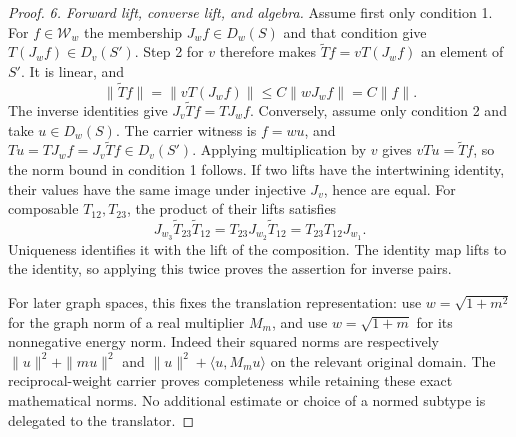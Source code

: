 \documentclass[11pt,a4paper]{article}
\theoremstyle{definition}
\theoremstyle{remark}
\begin{document}
\begin{proof}
\emph{6. Forward lift, converse lift, and algebra.}
Assume first only condition 1. For $f\in\mathcal W_w$ the
membership $J_wf\in D_w(S)$ and that condition give
$T(J_wf)\in D_v(S')$. Step 2 for $v$ therefore makes
$\widetilde Tf=vT(J_wf)$ an element of $S'$. It is linear, and
\[
 \|\widetilde Tf\|=\|vT(J_wf)\|
 \leq C\|wJ_wf\|=C\|f\|.
\]
The inverse identities give $J_v\widetilde Tf=TJ_wf$.
Conversely, assume only condition 2 and take $u\in D_w(S)$.
The carrier witness is $f=wu$, and
$Tu=TJ_wf=J_v\widetilde Tf\in D_v(S')$. Applying multiplication
by $v$ gives $vTu=\widetilde Tf$, so the norm bound in condition
1 follows. If two lifts have the intertwining identity, their values
have the same image under injective $J_v$, hence are equal.
For composable $T_{12},T_{23}$, the product of their lifts satisfies
\[
 J_{w_3}\widetilde T_{23}\widetilde T_{12}
 =T_{23}J_{w_2}\widetilde T_{12}
 =T_{23}T_{12}J_{w_1}.
\]
Uniqueness identifies it with the lift of the composition. The
identity map lifts to the identity, so applying this twice proves
the assertion for inverse pairs.

For later graph spaces, this fixes the translation representation:
use $w=\sqrt{1+m^2}$ for the graph norm of a real multiplier
$M_m$, and use $w=\sqrt{1+m}$ for its nonnegative energy norm.
Indeed their squared norms are respectively
$\|u\|^2+\|mu\|^2$ and
$\|u\|^2+\langle u,M_mu\rangle$ on the relevant original
domain. The reciprocal-weight carrier proves completeness while
retaining these exact mathematical norms. No additional estimate
or choice of a normed subtype is delegated to the translator.
\end{proof}
\end{document}
